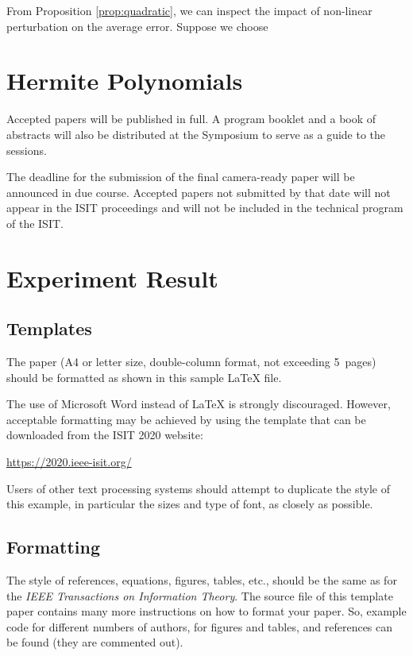 \documentclass[conference,letterpaper]{IEEEtran}
\begin{document}
From Proposition \ref{prop:quadratic}, we can inspect the impact of non-linear perturbation on the average error. Suppose we choose 

\section{Hermite Polynomials}\label{sec:hp}

Accepted papers will be published in full. 
A program booklet and a book of abstracts will also be
distributed at the Symposium to serve as a guide to the sessions.

The deadline for the submission of the final camera-ready paper will
be announced in due course.  Accepted papers not submitted by that
date will not appear in the ISIT proceedings and will not be included
in the technical program of the ISIT.


\section{Experiment Result}\label{sec:er}

\subsection{Templates}

The paper (A4 or letter size, double-column format, not exceeding
5~pages) should be formatted as shown in this sample \LaTeX{} file.

The use of Microsoft Word instead of \LaTeX{} is strongly
discouraged. However, acceptable formatting may be achieved by using
the template that can be downloaded from the ISIT 2020 website:
\begin{center}
  \url{https://2020.ieee-isit.org/}
\end{center}

Users of other text processing systems should attempt to duplicate the
style of this example, in particular the sizes and type of font, as
closely as possible.


\subsection{Formatting}

The style of references, equations, figures, tables, etc., should be
the same as for the \emph{IEEE Transactions on Information
  Theory}. The source file of this template paper contains many more
instructions on how to format your paper. So, example code for
different numbers of authors, for figures and tables, and references
can be found (they are commented out).
\end{document}
